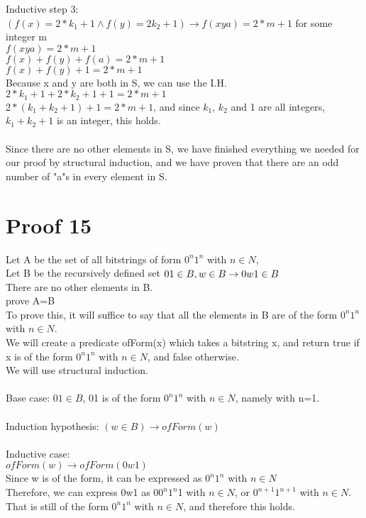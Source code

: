 \documentclass{article}
\begin{document}
Inductive step 3:\\
$(f(x) = 2*k_1+1 \land f(y)=2k_2+1) \rightarrow f(xya) = 2*m+1$ for some integer m\\
$f(xya) = 2*m+1$\\
$f(x)+f(y)+f(a) = 2*m+1$\\
$f(x)+f(y)+1 = 2*m+1$\\
Because x and y are both in S, we can use the I.H.\\
$2*k_1+1+2*k_2+1+1 = 2*m+1$\\
$2*(k_1+k_2+1)+1 = 2*m+1$, and since $k_1$, $k_2$ and 1 are all integers,  $k_1+k_2+1$ is an integer, this holds.\\
\\
Since there are no other elements in S, we have finished everything we needed for our proof by structural induction, and we have proven that there are an odd number of "a"s in every element in S. 



\section{Proof 15}
Let A be the set of all bitstrings of form $0^n1^n$ with $n \in N$, \\
Let B be the recursively defined set $01 \in B, \\w \in B \rightarrow 0w1 \in B$\\ There are no other elements in B.\\ prove A=B\\
To prove this, it will suffice to say that all the elements in B are of the form $0^n1^n$ with $n \in N$. \\
We will create a predicate ofForm(x) which takes a bitstring x, and return true if x is of the form $0^n1^n$ with $n \in N$, and false otherwise.\\
We will use structural induction.\\
\\
Base case: $01 \in B$, 01 is of the form $0^n1^n$ with $n \in N$, namely with n=1. \\
\\
Induction hypothesis: $(w \in B)\rightarrow ofForm(w)$\\
\\
Inductive case:\\
$ofForm(w) \rightarrow ofForm(0w1)$\\
Since w is of the form, it can be expressed as $0^n1^n$ with $n \in N$\\
Therefore, we can express 0w1 as 0$0^n1^n$1 with $n \in N$, or 
$0^{n+1}1^{n+1}$ with $n \in N$.\\
That is still of the form $0^n1^n$ with $n \in N$, and therefore this holds.
\end{document}
